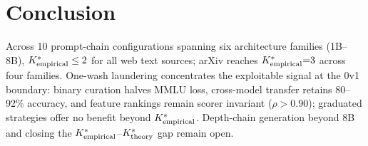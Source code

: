 \section{Conclusion}
\label{sec:conclusion}

Across 10 prompt-chain configurations spanning six architecture families (1B--8B), ${K^*_{\text{empirical}}} \leq 2$ for all web text sources; arXiv reaches ${K^*_{\text{empirical}}}{=}3$ across four families.
One-wash laundering concentrates the exploitable signal at the 0v1 boundary: binary curation halves MMLU loss, cross-model transfer retains 80--92\% accuracy, and feature rankings remain scorer invariant ($\rho > 0.90$); graduated strategies offer no benefit beyond ${K^*_{\text{empirical}}}$.
Depth-chain generation beyond 8B and closing the ${K^*_{\text{empirical}}}$--${K^*_{\text{theory}}}$ gap remain open.
